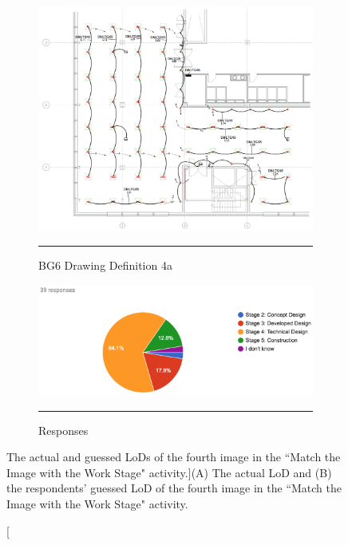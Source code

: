 \begin{figure}[htbp]
\centering
  \begin{subfigure}[b]{.35\textwidth}
  \centering
  \includegraphics[width=\textwidth]{figures/4aDwg02.png}
		\rule{\textwidth}{0.5pt} %
  \caption{BG6 Drawing Definition 4a}
  \label{}
\end{subfigure}
  \begin{subfigure}[b]{.61\textwidth}
  \centering
  \includegraphics[width=\textwidth]{figures/image4.png}
		\rule{\textwidth}{0.5pt} %
  \caption{Responses}
  \label{}
\end{subfigure}
\caption[The actual and guessed LoDs of the fourth image in the ``Match the Image with the Work Stage" activity.]{({\scriptsize A}) The actual LoD and ({\scriptsize B}) the respondents’ guessed LoD of the fourth image in the ``Match the Image with the Work Stage" activity.}
\label{image4}
\end{figure}



